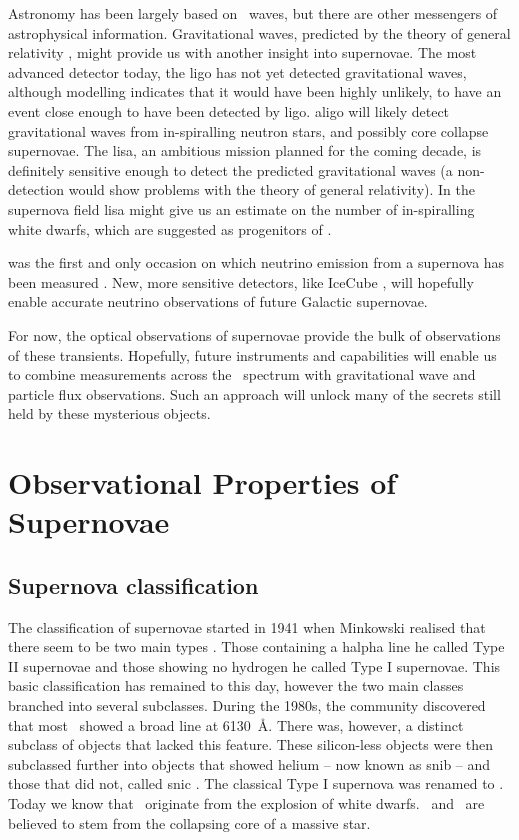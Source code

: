Astronomy has been largely based on \EM\ waves, but there are other messengers of astrophysical information. Gravitational waves, predicted by the theory of general relativity  \citep{1918SPAW.......154E}, might provide us with another insight into supernovae. The most advanced detector today, the \gls{ligo} has not yet detected gravitational waves, although modelling indicates that it would have been highly unlikely, to have an event close enough to have been detected by \gls{ligo}. \gls{aligo} will likely detect gravitational waves from in-spiralling neutron stars, and possibly core collapse supernovae. The \gls{lisa}, an ambitious mission planned for the coming decade, is definitely sensitive enough to detect the predicted gravitational waves (a non-detection would show problems with the theory of general relativity). In the supernova field \gls{lisa} might give us an estimate on the number of in-spiralling white dwarfs, which are suggested as progenitors of \sneia.

 was the first and only occasion on which neutrino emission from a supernova has been measured \citep{1987PhRvL..58.1494B,1987PhRvL..58.1490H,Alekseev:1988gp}. New, more sensitive detectors, like IceCube \citep{2008ICRC....4..835K}, will hopefully enable accurate neutrino observations of future Galactic supernovae.

For now, the optical observations of supernovae provide the bulk of observations of these transients. Hopefully, future instruments and capabilities will enable us to combine measurements across the \EM\ spectrum with gravitational wave and particle flux observations. Such an approach will unlock many of the secrets still held by these mysterious objects.

\section{Observational Properties of Supernovae}

\subsection{Supernova classification}
\label{sec:sn_classification}

The classification of supernovae started in 1941 when Minkowski realised that there seem to be two main types \citep{1941PASP...53..224M}. Those containing a \gls{halpha} line he called Type II supernovae and those showing no hydrogen he called Type I supernovae. This basic classification has remained to this day, however the two main classes branched into several subclasses. During the 1980s, the community discovered that most \sneia\ showed a broad  line at 6130~\AA. There was, however, a distinct subclass of objects that lacked this feature. These silicon-less objects were then subclassed further into objects that showed helium -- now known as \gls{snib} --  and those that did not, called \gls{snic} \citep[see spectra in Figure \ref{fig:sn_classification};][]{1987ApJ...317..355H, 1986ApJ...306L..77G}. The classical Type I supernova was renamed to \snia. Today we know that \sneia\ originate from the explosion of white dwarfs. \sneii\ and \sneibc\ are believed to stem from the collapsing core of a massive star. 

